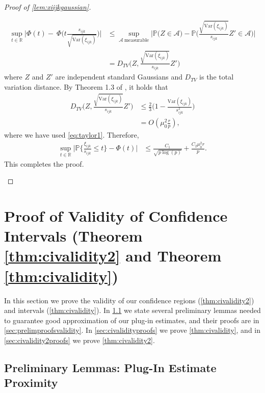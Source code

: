 \documentclass[10pt]{article}
\newcommand{\0}{{\mathbf{0}}}
\newcommand{\1}{{\mathbf{1}}}
\renewcommand{\citet}{\cite}
\newcommand{\p}{\mathbb{P}}
\begin{document}
\begin{proof}[Proof of \cref{lem:xiijkgaussian}]
\begin{itemize}
\begin{align*}
        \sup_{t\in \mathbb{R}} \bigg| \Phi(t) - \ \Phi\bigg( t \frac{s_{ijk}}{\sqrt{\mathrm{Var}(\xi_{ijk})}} \bigg) \bigg| &\leq \sup_{ \mathcal{A} \ \mathrm{ measurable}} \bigg| \p\bigg( Z \in \mathcal{A} \bigg) - \p\bigg( \frac{\sqrt{\mathrm{Var}(\xi_{ijk})}}{s_{ijk}} Z' \in \mathcal{A} \bigg) \bigg| \\
        &= D_{TV} \bigg( Z, \frac{\sqrt{\mathrm{Var}(\xi_{ijk})}}{s_{ijk}} Z' \bigg)
    \end{align*}
    where $Z$ and $Z'$ are independent standard Gaussians and $D_{TV}$ is the total variation distance.  By Theorem 1.3 of \citet{devroye_total_2022}, it holds that
    \begin{align*}
        D_{TV} \bigg( Z, \frac{\sqrt{\mathrm{Var}(\xi_{ijk})}}{s_{ijk}} Z' \bigg) &\leq \frac{2}{3} \bigg(1 - \frac{\mathrm{Var}(\xi_{ijk})}{s^2_{ijk}} \bigg) \\
        &= O( \mu_0^2 \frac{r}{p}),
    \end{align*}
    where we have used \eqref{eq:taylor1}.  Therefore,
    \begin{align*}
        \sup_{t\in \mathbb{R}}\bigg| \p\bigg\{ \frac{\xi_{ijk}}{s_{ijk}} \leq t \bigg\} - \Phi(t) \bigg| &\leq \frac{C_1}{\sqrt{p\log(p)}} + \frac{C_2 \mu_0^2 r}{p}.
    \end{align*}
This completes the proof.
\end{itemize}
\end{proof}



\section{Proof of Validity of Confidence Intervals (Theorem \ref{thm:civalidity2} and Theorem \ref{thm:civalidity})} \label{sec:ciproofs}
In this section we prove the validity of our confidence regions (\cref{thm:civalidity2}) and intervals (\cref{thm:civalidity}). %
 In \cref{sec:civaliditylemmas} we state several preliminary lemmas needed to guarantee good approximation of our plug-in estimates, and their proofs are in \cref{sec:prelimproofsvalidity}.  In \cref{sec:civalidityproofs} we prove \cref{thm:civalidity}, and in
\cref{sec:civalidity2proofs} we prove \cref{thm:civalidity2}. %

\subsection{Preliminary Lemmas: Plug-In Estimate Proximity} \label{sec:civaliditylemmas}
\end{document}
